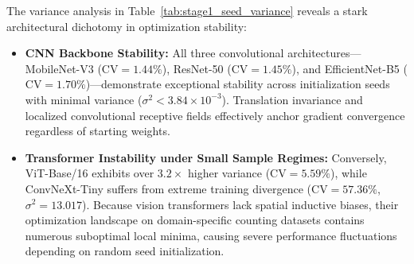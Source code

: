 \documentclass[journal,twocolumn]{IEEEtran}
\begin{document}
\begin{table}[h]
\centering
\caption{Stage 1 Seed Stochasticity, Variance, and Coefficient of Variation ($\text{CV} = \text{Std} / \text{Mean}$) for Overall Counting MAE Across 5 Seeds.}
\label{tab:stage1_seed_variance}
\end{table}

The variance analysis in Table~\ref{tab:stage1_seed_variance} reveals a stark architectural dichotomy in optimization stability:
\begin{itemize}
    \item \textbf{CNN Backbone Stability:} All three convolutional architectures—MobileNet-V3 ($\text{CV} = 1.44\%$), ResNet-50 ($\text{CV} = 1.45\%$), and EfficientNet-B5 ($\text{CV} = 1.70\%$)—demonstrate exceptional stability across initialization seeds with minimal variance ($\sigma^2 < 3.84 \times 10^{-3}$). Translation invariance and localized convolutional receptive fields effectively anchor gradient convergence regardless of starting weights.
    \item \textbf{Transformer Instability under Small Sample Regimes:} Conversely, ViT-Base/16 exhibits over $3.2\times$ higher variance ($\text{CV} = 5.59\%$), while ConvNeXt-Tiny suffers from extreme training divergence ($\text{CV} = 57.36\%$, $\sigma^2 = 13.017$). Because vision transformers lack spatial inductive biases, their optimization landscape on domain-specific counting datasets contains numerous suboptimal local minima, causing severe performance fluctuations depending on random seed initialization.
\end{itemize}
\end{document}
